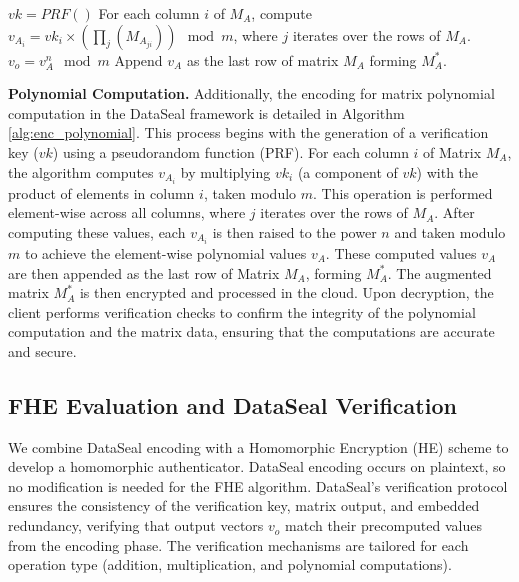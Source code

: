 \begin{algorithm}
\caption{\texttt{DataSeal.encode($f((.)^n$),$M_A$)}}
\label{alg:enc_polynomial}
\begin{algorithmic}[1]
\STATE $vk = PRF()$
\STATE For each column $i$ of $M_A$, compute $v_{A_i} = vk_i \times \left( \prod_{j} (M_{A_{ji}}) \right) \mod m$, where $j$ iterates over the rows of $M_A$.
\STATE $v_o = v_{A}^n \mod m $ 
\STATE Append $v_A$ as the last row of matrix $M_A$ forming $M^*_A$.
\end{algorithmic}
\end{algorithm}

\noindent\textbf{Polynomial Computation.}
Additionally, the encoding for matrix polynomial computation in the DataSeal framework is detailed in Algorithm \ref{alg:enc_polynomial}. This process begins with the generation of a verification key (\( vk \)) using a pseudorandom function (PRF). For each column \( i \) of Matrix \( M_A \), the algorithm computes \( v_{A_i} \) by multiplying \( vk_i \) (a component of \( vk \)) with the product of elements in column \( i \), taken modulo \( m \). This operation is performed element-wise across all columns, where \( j \) iterates over the rows of \( M_A \). After computing these values, each \( v_{A_i} \) is then raised to the power \( n \) and taken modulo \( m \) to achieve the element-wise polynomial values \( v_A \). These computed values \( v_A \) are then appended as the last row of Matrix \( M_A \), forming \( M^*_A \). The augmented matrix \( M^*_A \) is then encrypted and processed in the cloud. Upon decryption, the client performs verification checks to confirm the integrity of the polynomial computation and the matrix data, ensuring that the computations are accurate and secure.


\subsection{FHE Evaluation and DataSeal Verification}
\label{s:cloud}

We combine DataSeal encoding with a Homomorphic Encryption (HE) scheme to develop a homomorphic authenticator. DataSeal encoding occurs on plaintext, so no modification is needed for the FHE algorithm. DataSeal's verification protocol ensures the consistency of the verification key, matrix output, and embedded redundancy, verifying that output vectors \(v_o\) match their precomputed values from the encoding phase. The verification mechanisms are tailored for each operation type (addition, multiplication, and polynomial computations).

